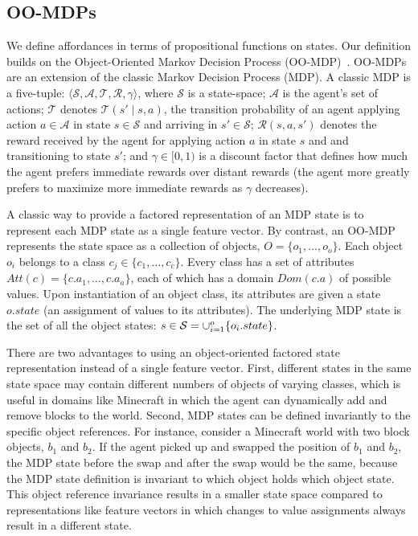 \documentclass[conference]{IEEEtran}
\begin{document}
\subsection{OO-MDPs}
We define affordances in terms of propositional functions on states. Our definition builds on the Object-Oriented Markov Decision Process
(OO-MDP)~\citep{diuk08}.  OO-MDPs are an extension of
the classic Markov Decision Process (MDP).  A classic MDP is a
five-tuple: $\langle \mathcal{S}, \mathcal{A}, \mathcal{T},
\mathcal{R}, \gamma \rangle$, where $\mathcal{S}$ is a state-space;
$\mathcal{A}$ is the agent's set of actions; $\mathcal{T}$ denotes
$\mathcal{T}(s' \mid s,a)$, the transition probability of an agent
applying action $a \in \mathcal{A}$ in state $s \in \mathcal{S}$ and
arriving in $s' \in \mathcal{S}$; $\mathcal{R}(s,a,s')$ denotes the
reward received by the agent for applying action $a$ in state $s$ and
and transitioning to state $s'$; and $\gamma \in [0, 1)$ is a discount
  factor that defines how much the agent prefers immediate rewards
  over distant rewards (the agent more greatly prefers to maximize
  more immediate rewards as $\gamma$ decreases).

A classic way to provide a factored representation of an MDP state is to represent
each MDP state as a single feature vector. By contrast, an OO-MDP represents the state space as a collection of objects,
$O = \{o_1, \ldots, o_o \}$.  Each object $o_i$ belongs to a
class $c_j \in  \{c_1, \ldots, c_c\}$. Every class has a set of attributes
$Att(c) = \{c.a_1, \ldots, c.a_a \}$, each of which has a domain $Dom(c.a)$ of possible values.
Upon instantiation of an object class, its attributes are given a state $o.state$
(an assignment of values to its attributes).  The underlying MDP state is the set
of all the object states: $s \in {\cal S} = \cup_{i = 1}^o \{o_i.state\}$.

There are two advantages to using an object-oriented factored state
representation instead of a single feature vector. First, different
states in the same state space may contain different numbers of
objects of varying classes, which is useful in domains like Minecraft
in which the agent can dynamically add and remove blocks to the
world. Second, MDP states can be defined invariantly to the specific
object references.  For instance, consider a Minecraft world with two
block objects, $b_1$ and $b_2$.  If the agent picked up and swapped
the position of $b_1$ and $b_2$, the MDP state before the swap and
after the swap would be the same, because the MDP state definition is
invariant to which object holds which object state. This
object reference invariance results in a smaller state space compared
to representations like feature vectors in which changes to value
assignments always result in a different state.
\end{document}
